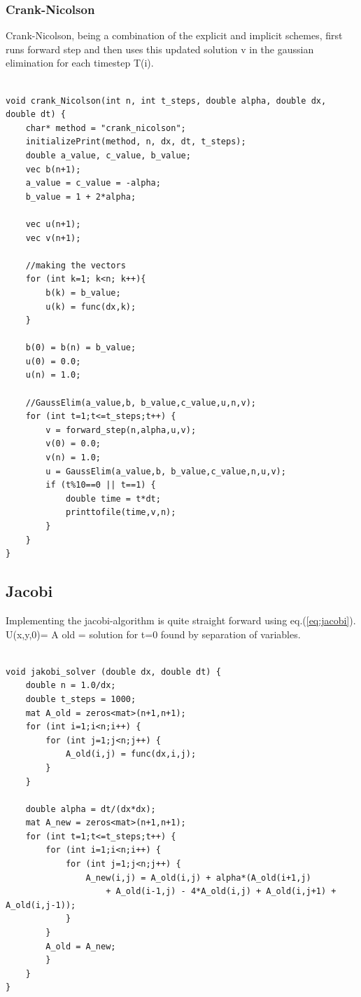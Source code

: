 \documentclass[a4paper,10pt]{article}
\begin{document}
\subsubsection{Crank-Nicolson}
Crank-Nicolson, being a combination of the explicit and implicit schemes, first runs forward step and then uses this updated solution v in the gaussian elimination for each timestep T(i).
\begin{verbatim}

void crank_Nicolson(int n, int t_steps, double alpha, double dx, double dt) {
    char* method = "crank_nicolson";
    initializePrint(method, n, dx, dt, t_steps);
    double a_value, c_value, b_value;
    vec b(n+1);
    a_value = c_value = -alpha;
    b_value = 1 + 2*alpha;

    vec u(n+1);
    vec v(n+1);

    //making the vectors
    for (int k=1; k<n; k++){
        b(k) = b_value;
        u(k) = func(dx,k);
    }

    b(0) = b(n) = b_value;
    u(0) = 0.0;
    u(n) = 1.0;

    //GaussElim(a_value,b, b_value,c_value,u,n,v);
    for (int t=1;t<=t_steps;t++) {
        v = forward_step(n,alpha,u,v);
        v(0) = 0.0;
        v(n) = 1.0;
        u = GaussElim(a_value,b, b_value,c_value,n,u,v);
        if (t%10==0 || t==1) {
            double time = t*dt;
            printtofile(time,v,n);
        }
    }
}
\end{verbatim}
\subsection{Jacobi}
Implementing the jacobi-algorithm is quite straight forward using eq.(\ref{eq:jacobi}). U(x,y,0)= A old = solution for t=0 found by separation of variables.
\begin{verbatim}

void jakobi_solver (double dx, double dt) {
    double n = 1.0/dx;
    double t_steps = 1000;
    mat A_old = zeros<mat>(n+1,n+1);
    for (int i=1;i<n;i++) {
        for (int j=1;j<n;j++) {
            A_old(i,j) = func(dx,i,j);
        }
    }

    double alpha = dt/(dx*dx);
    mat A_new = zeros<mat>(n+1,n+1);
    for (int t=1;t<=t_steps;t++) {
        for (int i=1;i<n;i++) {
            for (int j=1;j<n;j++) {
                A_new(i,j) = A_old(i,j) + alpha*(A_old(i+1,j)
                    + A_old(i-1,j) - 4*A_old(i,j) + A_old(i,j+1) + A_old(i,j-1));
            }
        }
        A_old = A_new;
        }
    }
} 
\end{verbatim}
\end{document}
